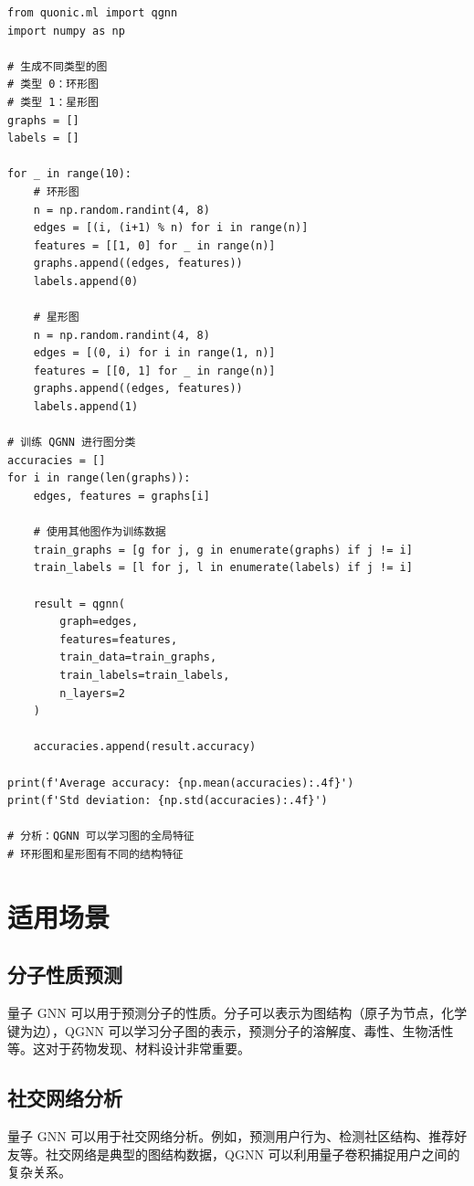 \documentclass[12pt,a4paper]{article}
\begin{document}
\begin{verbatim}
from quonic.ml import qgnn
import numpy as np

# 生成不同类型的图
# 类型 0：环形图
# 类型 1：星形图
graphs = []
labels = []

for _ in range(10):
    # 环形图
    n = np.random.randint(4, 8)
    edges = [(i, (i+1) % n) for i in range(n)]
    features = [[1, 0] for _ in range(n)]
    graphs.append((edges, features))
    labels.append(0)

    # 星形图
    n = np.random.randint(4, 8)
    edges = [(0, i) for i in range(1, n)]
    features = [[0, 1] for _ in range(n)]
    graphs.append((edges, features))
    labels.append(1)

# 训练 QGNN 进行图分类
accuracies = []
for i in range(len(graphs)):
    edges, features = graphs[i]

    # 使用其他图作为训练数据
    train_graphs = [g for j, g in enumerate(graphs) if j != i]
    train_labels = [l for j, l in enumerate(labels) if j != i]

    result = qgnn(
        graph=edges,
        features=features,
        train_data=train_graphs,
        train_labels=train_labels,
        n_layers=2
    )

    accuracies.append(result.accuracy)

print(f'Average accuracy: {np.mean(accuracies):.4f}')
print(f'Std deviation: {np.std(accuracies):.4f}')

# 分析：QGNN 可以学习图的全局特征
# 环形图和星形图有不同的结构特征
\end{verbatim}

\section{适用场景}

\subsection{分子性质预测}

量子 GNN 可以用于预测分子的性质。分子可以表示为图结构（原子为节点，化学键为边），QGNN 可以学习分子图的表示，预测分子的溶解度、毒性、生物活性等。这对于药物发现、材料设计非常重要。

\subsection{社交网络分析}

量子 GNN 可以用于社交网络分析。例如，预测用户行为、检测社区结构、推荐好友等。社交网络是典型的图结构数据，QGNN 可以利用量子卷积捕捉用户之间的复杂关系。
\end{document}
